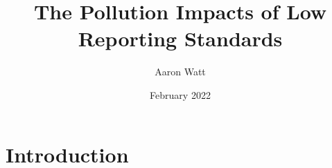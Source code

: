 \documentclass[12pt]{article}
\title{The Pollution Impacts of Low Reporting Standards}
\author{Aaron Watt}
\date{February 2022}
\begin{document}
\maketitle

\begin{abstract}










\vspace{2em}
\end{abstract}







\section{Introduction}
\end{document}

